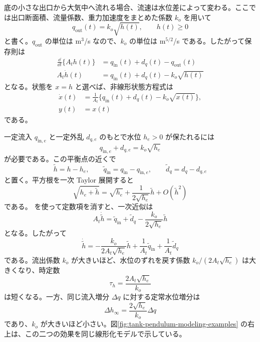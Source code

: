 底の小さな出口から大気中へ流れる場合、流速は水位差によって変わる。ここでは出口断面積、流量係数、重力加速度をまとめた係数 $k_o$ を用いて
\begin{equation}
  q_{\mathrm{out}}(t)=k_o\sqrt{h(t)},\qquad h(t)\ge0
\end{equation}
と書く。$q_{\mathrm{out}}$ の単位は m$^3$/s なので、$k_o$ の単位は m$^{5/2}$/s である。したがって保存則は
\begin{align}
  \frac{\dd}{\dd t}\{A_t h(t)\}
  &=q_{\mathrm{in}}(t)+d_q(t)-q_{\mathrm{out}}(t)\\
  A_t\dot{h}(t)
  &=q_{\mathrm{in}}(t)+d_q(t)-k_o\sqrt{h(t)}
\end{align}
となる。状態を $x=h$ と選べば、非線形状態方程式は
\begin{align}
  \dot{x}(t)&=\frac{1}{A_t}\{q_{\mathrm{in}}(t)+d_q(t)-k_o\sqrt{x(t)}\},\label{eq:tank-level-state}\\
  y(t)&=x(t)
\end{align}
である。

一定流入 $q_{\mathrm{in},e}$ と一定外乱 $d_{q,e}$ のもとで水位 $h_e>0$ が保たれるには
\begin{equation}
  q_{\mathrm{in},e}+d_{q,e}=k_o\sqrt{h_e}
  \label{eq:tank-level-equilibrium}
\end{equation}
が必要である。この平衡点の近くで
\begin{equation}
  \tilde{h}=h-h_e,\qquad
  \tilde{q}_{\mathrm{in}}=q_{\mathrm{in}}-q_{\mathrm{in},e},\qquad
  \tilde{d}_q=d_q-d_{q,e}
\end{equation}
と置く。平方根を一次 Taylor 展開すると
\begin{equation}
  \sqrt{h_e+\tilde{h}}
  =\sqrt{h_e}+\frac{1}{2\sqrt{h_e}}\tilde{h}
  +O(\tilde{h}^2)
\end{equation}
である。 を使って定数項を消すと、一次近似は
\begin{equation}
  A_t\dot{\tilde{h}}
  =\tilde{q}_{\mathrm{in}}+\tilde{d}_q
  -\frac{k_o}{2\sqrt{h_e}}\tilde{h}
\end{equation}
となる。したがって
\begin{equation}
  \dot{\tilde{h}}
  =-\frac{k_o}{2A_t\sqrt{h_e}}\tilde{h}
   +\frac{1}{A_t}\tilde{q}_{\mathrm{in}}
   +\frac{1}{A_t}\tilde{d}_q
  \label{eq:tank-level-linearization}
\end{equation}
である。流出係数 $k_o$ が大きいほど、水位のずれを戻す係数 $k_o/(2A_t\sqrt{h_e})$ は大きくなり、時定数
\begin{equation}
  \tau_h=\frac{2A_t\sqrt{h_e}}{k_o}
\end{equation}
は短くなる。一方、同じ流入増分 $\Delta q$ に対する定常水位増分は
\begin{equation}
  \Delta h_\infty=\frac{2\sqrt{h_e}}{k_o}\Delta q
\end{equation}
であり、$k_o$ が大きいほど小さい。図\ref{fig:tank-pendulum-modeling-examples} の右上は、この二つの効果を同じ線形化モデルで示している。

